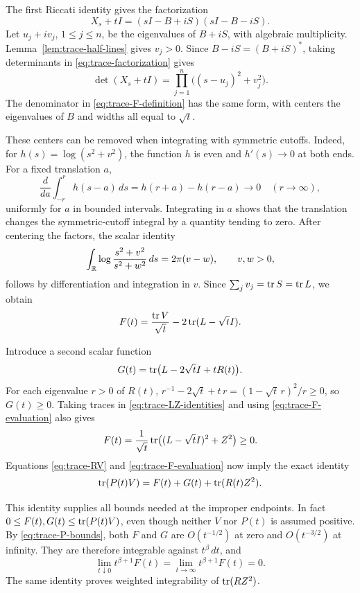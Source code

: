 The first Riccati identity gives the factorization
\begin{equation}\label{eq:trace-factorization}
             X_s+tI=(sI-B+iS)(sI-B-iS).
\end{equation}
Let $u_j+iv_j$, $1\leq j\leq n$, be the eigenvalues of $B+iS$,
with algebraic multiplicity.  Lemma~\ref{lem:trace-half-lines}
gives $v_j>0$.  Since $B-iS=(B+iS)^*$, taking determinants in
\eqref{eq:trace-factorization} gives
\[
 \det(X_s+tI)=\prod_{j=1}^n\bigl((s-u_j)^2+v_j^2\bigr).
\]
The denominator in \eqref{eq:trace-F-definition} has the same form,
with centers the eigenvalues of $B$ and widths all equal to
$\sqrt t$.

These centers can be removed when integrating with symmetric
cutoffs.  Indeed, for $h(s)=\log(s^2+v^2)$, the function $h$ is
even and $h'(s)\to0$ at both ends.  For a fixed translation $a$,
\[
 \frac{d}{da}\int_{-r}^r h(s-a)\,ds=h(r+a)-h(r-a)\longrightarrow0
 \quad(r\to\infty),
\]
uniformly for $a$ in bounded intervals.  Integrating in $a$ shows
that the translation changes the symmetric-cutoff integral by a
quantity tending to zero.  After centering the factors, the scalar
identity
\[
 \int_\mathbb R\log\frac{s^2+v^2}{s^2+w^2}\,ds=2\pi(v-w),
 \qquad v,w>0,
\]
follows by differentiation and integration in $v$.
Since $\sum_jv_j=\operatorname{tr} S=\operatorname{tr} L$, we obtain
\begin{equation}\label{eq:trace-F-evaluation}
                  F(t)=\frac{\operatorname{tr} V}{\sqrt t}
                         -2\operatorname{tr}(L-\sqrt t I).
\end{equation}

Introduce a second scalar function
\begin{equation}\label{eq:trace-G-definition}
                 G(t)=\operatorname{tr}\bigl(L-2\sqrt t I+tR(t)\bigr).
\end{equation}
For each eigenvalue $r>0$ of $R(t)$,
$r^{-1}-2\sqrt t+t\,r=(1-\sqrt t\,r)^2/r\geq0$, so $G(t)\geq0$.
Taking traces in \eqref{eq:trace-LZ-identities} and using
\eqref{eq:trace-F-evaluation} also gives
\begin{equation}\label{eq:trace-F-positive}
 F(t)=\frac1{\sqrt t}
        \operatorname{tr}\bigl((L-\sqrt t I)^2+Z^2\bigr)\geq0.
\end{equation}
Equations \eqref{eq:trace-RV} and \eqref{eq:trace-F-evaluation}
now imply the exact identity
\begin{equation}\label{eq:trace-FG-identity}
                   \operatorname{tr}(P(t)V)=F(t)+G(t)+\operatorname{tr}(R(t)Z^2).
\end{equation}

This identity supplies all bounds needed at the improper endpoints.
In fact $0\leq F(t),G(t)\leq\operatorname{tr}(P(t)V)$, even though neither
$V$ nor $P(t)$ is assumed positive.  By
\eqref{eq:trace-P-bounds}, both $F$ and $G$ are $O(t^{-1/2})$
at zero and $O(t^{-3/2})$ at infinity.  They are therefore
integrable against $t^\beta\,dt$, and
\begin{equation}\label{eq:trace-F-boundary}
 \lim_{t\downarrow0}t^{\beta+1}F(t)
   =\lim_{t\to\infty}t^{\beta+1}F(t)=0.
\end{equation}
The same identity proves weighted integrability of $\operatorname{tr}(RZ^2)$.

